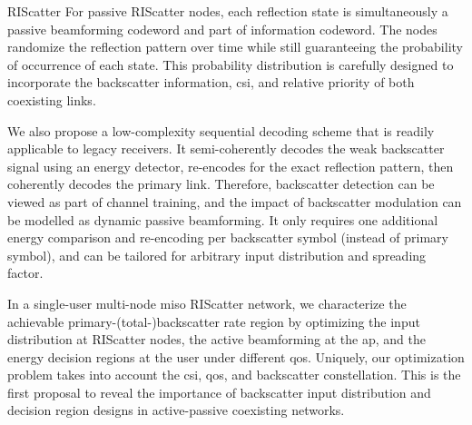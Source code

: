 \documentclass[journal]{IEEEtran}
\begin{document}
\begin{section}{RIScatter}
	\label{sc:riscatter}
	For passive RIScatter nodes, each reflection state is simultaneously a passive beamforming codeword and part of information codeword.
	The nodes randomize the reflection pattern over time while still guaranteeing the probability of occurrence of each state.
	This probability distribution is carefully designed to incorporate the backscatter information, \gls{csi}, and relative priority of both coexisting links.

	We also propose a low-complexity sequential decoding scheme that is readily applicable to legacy receivers.
	It semi-coherently decodes the weak backscatter signal using an energy detector, re-encodes for the exact reflection pattern, then coherently decodes the primary link.
	Therefore, backscatter detection can be viewed as part of channel training, and the impact of backscatter modulation can be modelled as dynamic passive beamforming.
	It only requires one additional energy comparison and re-encoding per backscatter symbol (instead of primary symbol), and can be tailored for arbitrary input distribution and spreading factor.

	In a single-user multi-node \gls{miso} RIScatter network, we characterize the achievable primary-(total-)backscatter rate region by optimizing the input distribution at RIScatter nodes, the active beamforming at the \gls{ap}, and the energy decision regions at the user under different \gls{qos}.
	Uniquely, our optimization problem takes into account the \gls{csi}, \gls{qos}, and backscatter constellation.
	This is the first proposal to reveal the importance of backscatter input distribution and decision region designs in active-passive coexisting networks.
\end{section}
\end{document}
